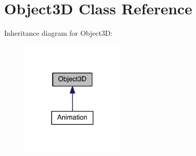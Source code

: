 \hypertarget{class_object3_d}{}\section{Object3\+D Class Reference}
\label{class_object3_d}


Inheritance diagram for Object3\+D\+:\nopagebreak
\begin{figure}[H]
\begin{center}
\leavevmode
\includegraphics[width=141pt]{class_object3_d__inherit__graph}
\end{center}
\end{figure}
